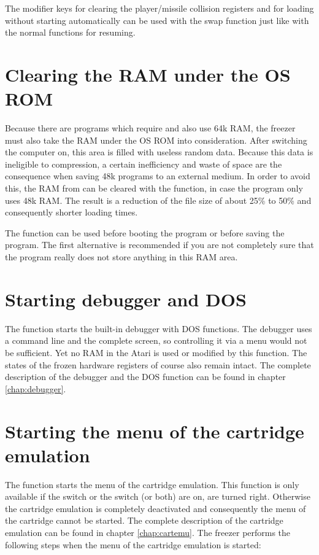 The modifier keys \fkeys{} for clearing the player/missile collision registers
and \fkeyc{} for loading without starting automatically can be used with the
swap function just like with the normal functions for resuming.

\section{Clearing the RAM under the OS ROM}
Because there are programs which require and also use 64k RAM, the freezer must
also take the RAM under the OS ROM into consideration. After switching the
computer on, this area is filled with useless random data. Because this data is
ineligible to compression, a certain inefficiency and waste of space are the
consequence when saving 48k programs to an external medium. In order to avoid this,
the RAM from  can be cleared with the function, in
case the program only uses 48k RAM. The result is a reduction of the file size
of about 25\% to 50\% and consequently shorter loading times.

The function can be used before booting the program or before saving the
program. The first alternative is recommended  if you are not completely sure that
the program really does not store anything in this RAM area.


\section{Starting debugger and DOS}

The function  starts the built-in debugger with DOS functions. The
debugger uses a command line and the complete screen, so controlling it via a
menu would not be sufficient. Yet no RAM in the Atari is used or modified by
this function. The states of the frozen hardware registers of course also remain
intact.  The complete description of the debugger and the DOS function can be
found in chapter \ref{chap:debugger}.

\section{Starting the menu of the cartridge emulation}

The function  starts the menu of the cartridge emulation. This function
is only available if the  switch or the  switch (or
both) are on, \ie are turned right. Otherwise the cartridge emulation is
completely deactivated and consequently the menu of the cartridge cannot be
started. The complete description of the cartridge emulation can be found in
chapter \ref{chap:cartemu}. The freezer performs the following steps when the
menu of the cartridge emulation is started:
\clearpage

